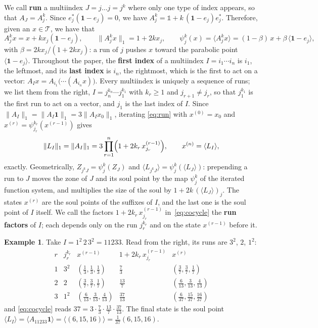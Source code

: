 \documentclass[11pt]{amsart}
\newcommand{\id}{\mathds{1}}
\theoremstyle{definition}
\newtheorem{example}[proposition]{Example}
\theoremstyle{remark}
\newcommand{\one}{\mathbf 1}
\newcommand{\cT}{\mathcal T}
\newcommand{\norm}[1]{\lVert #1\rVert}
\newcommand{\pr}[1]{\langle #1\rangle}
\begin{document}
We call {\bf run} a multiindex $J=j\dots j=j^k$ where only one type of index appears, so that $A_J=A^k_j$.
Since $e_j^*(\one-e_j)=0$, we have $A_j^k=\id+k\,(\one-e_j)e_j^*$. 
Therefore, given an $x\in\cT$, we have that
\begin{equation}\label{eq:run}
  A_j^kx=x+kx_j(\one-e_j),\qquad
  \norm{A_j^kx}_1=1+2kx_j,\qquad
  \psi_j^k(x)=\pr{A_j^kx}=(1-\beta)\,x+\beta\,\pr{\one-e_j},
\end{equation}
with $\beta=2kx_j/(1+2kx_j)$: a run of $j$ pushes $x$ toward the parabolic
point $\pr{\one-e_j}$. Throughout the paper, the \textbf{first index} of a multiindex $I=i_1\cdots i_n$ is $i_1$, the leftmost, and its \textbf{last index} is $i_n$, the rightmost, which is the first to act on a vector: $A_Ix=A_{i_1}\bigl(\cdots(A_{i_n}x)\bigr)$. Every multiindex is uniquely a sequence of runs; we list them from the
right, $I=j_n^{k_n}\cdots j_1^{k_1}$ with $k_r\ge1$ and $j_{r+1}\neq j_r$, so that
$j_1^{k_1}$ is the first run to act on a vector, and $j_1$ is the last index of $I$. Since $\norm{A_I}_1=\norm{A_I\one}_1
=3\norm{A_Ix_0}_1$, iterating \eqref{eq:run} with $x^{(0)}=x_0$ and
$x^{(r)}=\psi_{j_r}^{k_r}(x^{(r-1)})$ gives
\begin{equation}\label{eq:cocycle}
  \norm{L_I}_1=\norm{A_I}_1=3\prod_{r=1}^n\Bigl(1+2k_r\,x^{(r-1)}_{j_r}\Bigr),
  \qquad x^{(n)}=\pr{L_I},
\end{equation}
exactly. Geometrically, $Z_{j^kJ}=\psi_j^k(Z_J)$ and $\pr{L_{j^kJ}}=\psi_j^k(\pr{L_J})$:
prepending a run to $J$ moves the zone of $J$ and its soul point by the map
$\psi_j^k$ of the iterated function system, and multiplies the size of the soul by
$1+2k\,(\pr{L_J})_j$. The states $x^{(r)}$ are the soul points of the
suffixes of $I$, and the last one is the soul point of $I$ itself. We call the factors $1+2k_r\,x^{(r-1)}_{j_r}$ in~\eqref{eq:cocycle} the \textbf{run factors} of $I$; each depends only on the run $j_r^{k_r}$ and on the state $x^{(r-1)}$ before it.

\begin{example}\label{ex:run}
Take $I=1^2\,2\,3^2=11233$. Read from the right, its runs are $3^2$, $2$, $1^2$:
\[
\renewcommand{\arraystretch}{1.2}
\begin{array}{c|c|c|c|c}
  r & j_r^{k_r} & x^{(r-1)} & 1+2k_r\,x^{(r-1)}_{j_r} & x^{(r)}\\\hline
  1 & 3^2 & (\frac13,\frac13,\frac13) & \frac73 & (\frac37,\frac37,\frac17)\\
  2 & 2 & (\frac37,\frac37,\frac17) & \frac{13}7 & (\frac6{13},\frac3{13},\frac4{13})\\
  3 & 1^2 & (\frac6{13},\frac3{13},\frac4{13}) & \frac{37}{13} & (\frac6{37},\frac{15}{37},\frac{16}{37})
\end{array}
\]
and \eqref{eq:cocycle} reads $37=3\cdot\frac73\cdot\frac{13}7\cdot\frac{37}{13}$. The
final state is the soul point $\pr{L_I}=\pr{A_{11233}\one}=\pr{(6,15,16)}=\frac1{37}(6,15,16)$.
\end{example}
\end{document}
